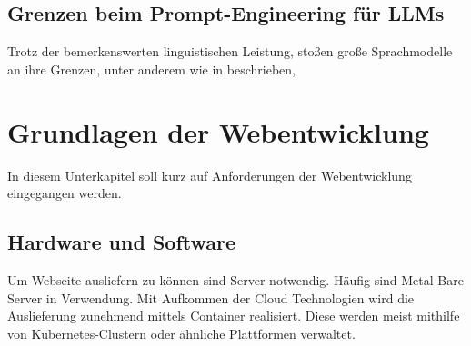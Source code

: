 




\subsection{Grenzen beim Prompt-Engineering für LLMs}
Trotz der bemerkenswerten linguistischen Leistung, stoßen große Sprachmodelle an ihre Grenzen, unter anderem wie in \cite{amatriain-2024} beschrieben,





\section{Grundlagen der Webentwicklung}
In diesem Unterkapitel soll kurz auf Anforderungen der Webentwicklung eingegangen werden.


\subsection{Hardware und Software}
Um Webseite ausliefern zu können sind Server notwendig. Häufig sind Metal Bare Server in Verwendung. Mit Aufkommen der Cloud Technologien wird die Auslieferung zunehmend mittels Container realisiert. Diese werden meist mithilfe von Kubernetes-Clustern oder ähnliche Plattformen verwaltet.\vspace{0.2cm}


